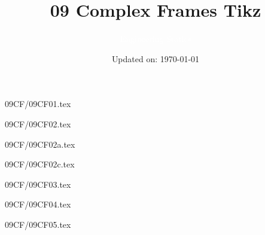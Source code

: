 \documentclass[9pt, xcolor={svgnames, x11names},professionalfonts]{beamer}
\title[09 Complex Frames (Tikz)]{\Huge 09 Complex Frames Tikz}
\subtitle[Engineering Statics]{\Large\textcolor{white}{Engineering Statics}}
\author{}
\date{\small Updated on: \today}
\def\scale{1}
\begin{document}

\begin{frame}[plain]    %
	\titlepage
\end{frame}




\begin{frame}{09CF/09CF01.tex}
	\def\scale{0.5}
	
\end{frame}


\begin{frame}{09CF/09CF02.tex}
	\def\scale{0.5}
	
\end{frame}


\begin{frame}{09CF/09CF02a.tex}
	\def\scale{0.5}
	
\end{frame}


\begin{frame}{09CF/09CF02c.tex}
	\def\scale{0.5}
	
\end{frame}


\begin{frame}{09CF/09CF03.tex}
	\def\scale{0.5}
	
\end{frame}




\begin{frame}{09CF/09CF04.tex}
	\def\scale{0.5}
	
\end{frame}


\begin{frame}{09CF/09CF05.tex}
	
\end{frame}
\end{document}
